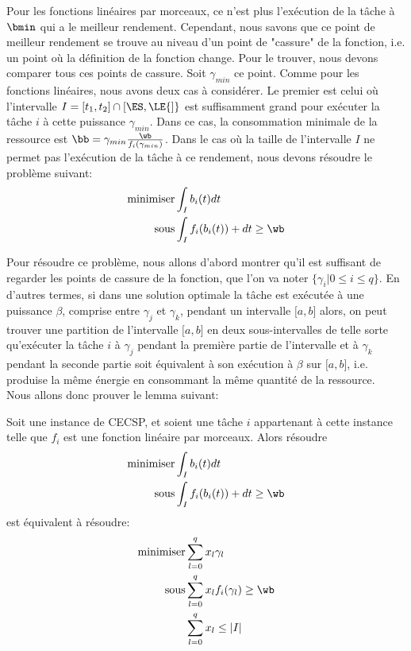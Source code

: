 Pour les fonctions linéaires par morceaux, ce n'est plus l'exécution de la tâche à $\bmin$ qui a le meilleur rendement. Cependant, nous savons que ce point de meilleur rendement se trouve au niveau d'un point de "cassure" de la fonction, i.e. un point où la définition de la fonction change. Pour le trouver, nous devons comparer tous ces points de cassure. Soit $\gamma_{min}$ ce point. Comme pour les fonctions linéaires, nous avons deux cas à considérer. Le premier est celui où l'intervalle $I={[}t_1,t_2{]}\cap {[}\ES,\LE{]}$ est suffisamment grand pour exécuter la tâche $i$ à cette puissance $\gamma_{min}$. Dans ce cas, la consommation minimale de la ressource est $\bb= \gamma_{min} \frac{\wb}{f_i(\gamma_{min})}$. Dans le cas où la taille de l'intervalle $I$ ne permet pas l'exécution de la tâche à ce rendement, nous devons résoudre le problème suivant: 
\begin{alignat*}{2}
  \text{minimiser}   & \int_{I} b_i(t)dt  \\
  \text{sous} & \int_{I} f_i(b_i(t))+dt \ge \wb
\end{alignat*}
		
Pour résoudre ce problème, nous allons d'abord montrer qu'il est suffisant de regarder les points de cassure de la fonction, que l'on va noter $\{\gamma_i | 0 \le i\le q\}$. En d'autres termes, si dans une solution optimale la tâche est exécutée à une puissance $\beta$, comprise entre $\gamma_j$ et $\gamma_k$, pendant un intervalle ${[}a,b{]}$ alors, on peut trouver une partition de l'intervalle ${[}a,b{]}$ en deux sous-intervalles de telle sorte qu'exécuter la tâche $i$ à $\gamma_j$ pendant la première partie de l'intervalle et à $\gamma_k$ pendant la seconde partie soit équivalent à son exécution à $\beta$ sur ${[}a,b{]}$, i.e. produise la même énergie en consommant la même quantité de la ressource.\\
Nous allons donc prouver le lemma suivant:

\begin{lemma}
  Soit une instance de CECSP, et soient une tâche $i$ appartenant à cette instance telle que $f_i$ est une fonction linéaire par morceaux. Alors résoudre
  \begin{alignat*}{2}
    \text{minimiser}   & \int_{I} b_i(t)dt  \\
    \text{sous} & \int_{I} f_i(b_i(t))+dt \ge \wb
  \end{alignat*}
  est équivalent à résoudre:
  \begin{alignat*}{2}
    \text{minimiser}   & \sum\limits_{l=0}^q x_l\gamma_l \\
    \text{sous} & \sum\limits_{l=0}^q x_lf_i(\gamma_l) \ge \wb \\
    & \sum\limits_{l=0}^q x_l \le |I|
  \end{alignat*}
\end{lemma}

